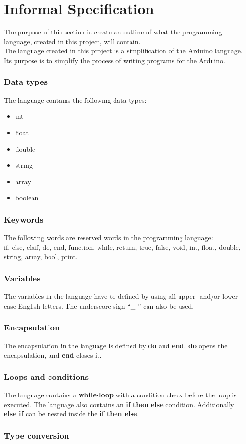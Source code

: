 \chapter{Informal Specification}\label{analysis:informal-specification}
The purpose of this section is create an outline of what the programming language, created in this project, will contain.
\\The language created in this project is a simplification of the Arduino language. Its purpose is to simplify the process of writing programs for the Arduino.   

\subsection{Data types}
The language contains the following data types: 
\begin{itemize}
\item int
\item float
\item double
\item string
\item array
\item boolean
\end{itemize}

\subsection{Keywords}
The following words are reserved words in the programming language:\\
if, else, elsif, do, end, function, while, return, true, false, void, int, float, double, string, array, bool, print.

\subsection{Variables}
The variables in the language have to defined by using all upper- and/or lower case English letters. The underscore sign ``\_ '' can also be used. 

\subsection{Encapsulation}
The encapsulation in the language is defined by \textbf{do} and \textbf{end}. \textbf{do} opens the encapsulation, and \textbf{end} closes it.   

\subsection{Loops and conditions}
The language contains a \textbf{while-loop} with a condition check before the loop is executed. The language also contains an \textbf{if then else} condition. Additionally \textbf{else if} can be nested inside the \textbf{if then else}.   

\subsection{Type conversion}
